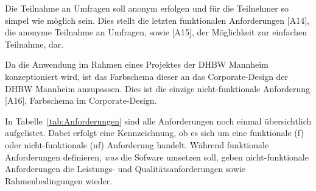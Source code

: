 Die Teilnahme an Umfragen soll anonym erfolgen und für die Teilnehmer so simpel wie möglich sein.
Dies stellt die letzten funktionalen Anforderungen [A14], die anonyme Teilnahme an Umfragen, sowie [A15], der Möglichkeit zur einfachen Teilnahme, dar.

Da die Anwendung im Rahmen eines Projektes der \acs{DHBW} Mannheim konzeptioniert wird, ist das Farbschema dieser an das Corporate-Design der \acs{DHBW} Mannheim anzupassen.
Dies ist die einzige nicht-funktionale Anforderung [A16], Farbschema im Corporate-Design.

In Tabelle~\vref{tab:Anforderungen} sind alle Anforderungen noch einmal übersichtlich aufgelistet.
Dabei erfolgt eine Kennzeichnung, ob es sich um eine funktionale (f) oder nicht-funktionale (nf) Anforderung handelt.
Während funktionale Anforderungen definieren, \emph{was} die Sofware umsetzen soll, geben nicht-funktionale Anforderungen die Leistungs- und Qualitätsanforderungen sowie Rahmenbedingungen wieder.\autocite[Vgl.][S. 10]{nl-robertson2012mastering}\autocite[Vgl.][S. 3 ff]{nl-braun2016nicht}

